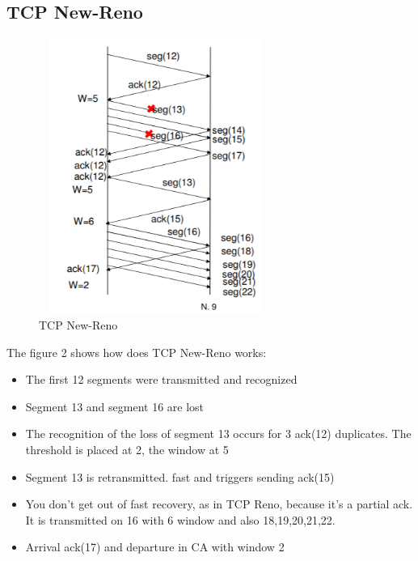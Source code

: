 {{\subsection{\normalsize TCP New-Reno}{
\begin{figure}[!htb]
	\includegraphics[width=7.6cm,height=9.0cm]{figure2}
	\caption{TCP New-Reno}
	\label{figure}
\end{figure}
The figure 2 shows how does TCP New-Reno works:	
\begin{itemize}
\item The first 12 segments were transmitted and recognized
\item Segment 13 and segment 16 are lost
\item The recognition of the loss of segment 13 occurs for 3  ack(12) duplicates.  The threshold is placed at 2, the window at 5
\item  Segment 13 is retransmitted. fast and triggers sending ack(15)
\item You don't get out of fast recovery, as in TCP Reno, because it's a partial ack. It is transmitted on 16 with
6 window and also 18,19,20,21,22.
\item Arrival ack(17) and departure in CA with window 2
\end{itemize}	
}
}}
